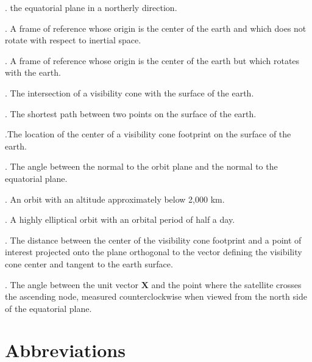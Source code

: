 \documentclass[oneside,12pt]{report}
\begin{document}
\vspace{8pt}
. 
the equatorial plane in a northerly direction. 

\vspace{8pt}
. A frame of reference whose origin is the center of the earth and which does not rotate with respect to inertial space.

\vspace{8pt}
. A frame of reference whose origin is the center of the earth but which rotates with the earth. 

\vspace{8pt} . The intersection of a visibility cone with the surface of the earth.

\vspace{8pt} . The shortest path between two points on the surface of the earth. 

\vspace{8pt} .The location of the center of a visibility cone footprint on the surface of the earth.

\vspace{8pt}
.  The angle between the normal to the orbit plane
and the normal to the equatorial plane.

\vspace{8pt} . An orbit with an altitude approximately below 2,000 km.

\vspace{8pt} . A highly elliptical orbit with an orbital period of half a day.

\vspace{8pt} . The distance between the center of the visibility cone footprint and a point of interest projected onto the plane orthogonal to the vector defining the visibility cone center and tangent to the earth surface.

\vspace{8pt}
. The angle
between the unit vector $\bm{X}$ and the point where the satellite crosses the
ascending node, measured counterclockwise when viewed from the north side of
the equatorial plane.


\chapter{Abbreviations}\label{Abbreviations}
\end{document}
